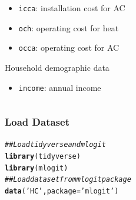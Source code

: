 \documentclass{beamer}\usepackage[]{graphicx}\usepackage[]{xcolor}
\makeatletter
\newcommand{\hlstr}[1]{\textcolor[rgb]{0.192,0.494,0.8}{#1}}%
\newcommand{\hlcom}[1]{\textcolor[rgb]{0.678,0.584,0.686}{\textit{#1}}}%
\newcommand{\hlstd}[1]{\textcolor[rgb]{0.345,0.345,0.345}{#1}}%
\newcommand{\hlkwc}[1]{\textcolor[rgb]{0.333,0.667,0.333}{#1}}%
\newcommand{\hlkwd}[1]{\textcolor[rgb]{0.737,0.353,0.396}{\textbf{#1}}}%
\newenvironment{kframe}{%
 \def\at@end@of@kframe{}%
 \ifinner\ifhmode%
  \def\at@end@of@kframe{\end{minipage}}%
  \begin{minipage}{\columnwidth}%
 \fi\fi%
 \def\FrameCommand##1{\hskip\@totalleftmargin \hskip-\fboxsep
 \colorbox{shadecolor}{##1}\hskip-\fboxsep
     \hskip-\linewidth \hskip-\@totalleftmargin \hskip\columnwidth}%
 \MakeFramed {\advance\hsize-\width
   \@totalleftmargin\z@ \linewidth\hsize
   \@setminipage}}%
 {\par\unskip\endMakeFramed%
 \at@end@of@kframe}
\newenvironment{knitrout}{}{} %
\makeatother
\begin{document}
\begin{frame}
\begin{columns}
\begin{column}{0.5\textwidth}
\begin{itemize}
                \item \texttt{icca}: installation cost for AC
                \item \texttt{och}: operating cost for heat
                \item \texttt{occa}: operating cost for AC
            \end{itemize}
            \vspace{2ex}
            Household demographic data
            \begin{itemize}
                \item \texttt{income}: annual income
            \end{itemize}
            \vspace{1ex}
        \end{column}
    \end{columns}
\end{frame}

\begin{frame}[fragile]\frametitle{Load Dataset}
\begin{knitrout}\footnotesize
{}\color{fgcolor}\begin{kframe}
\begin{alltt}
\hlcom{## Load tidyverse and mlogit}
\hlkwd{library}\hlstd{(tidyverse)}
\hlkwd{library}\hlstd{(mlogit)}
\hlcom{## Load dataset from mlogit package}
\hlkwd{data}\hlstd{(}\hlstr{'HC'}\hlstd{,} \hlkwc{package} \hlstd{=} \hlstr{'mlogit'}\hlstd{)}
\end{alltt}
\end{kframe}
\end{knitrout}
\end{frame}
\end{document}
